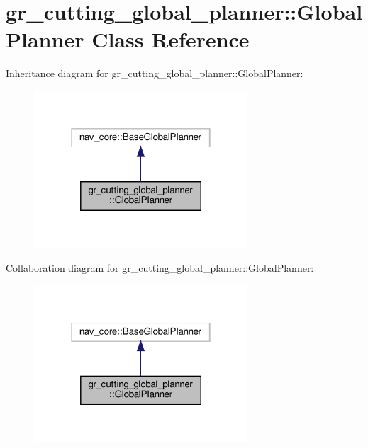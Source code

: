 \hypertarget{classgr__cutting__global__planner_1_1GlobalPlanner}{}\section{gr\+\_\+cutting\+\_\+global\+\_\+planner\+:\+:Global\+Planner Class Reference}
\label{classgr__cutting__global__planner_1_1GlobalPlanner}


Inheritance diagram for gr\+\_\+cutting\+\_\+global\+\_\+planner\+:\+:Global\+Planner\+:
\nopagebreak
\begin{figure}[H]
\begin{center}
\leavevmode
\includegraphics[width=226pt]{classgr__cutting__global__planner_1_1GlobalPlanner__inherit__graph}
\end{center}
\end{figure}


Collaboration diagram for gr\+\_\+cutting\+\_\+global\+\_\+planner\+:\+:Global\+Planner\+:
\nopagebreak
\begin{figure}[H]
\begin{center}
\leavevmode
\includegraphics[width=226pt]{classgr__cutting__global__planner_1_1GlobalPlanner__coll__graph}
\end{center}
\end{figure}
